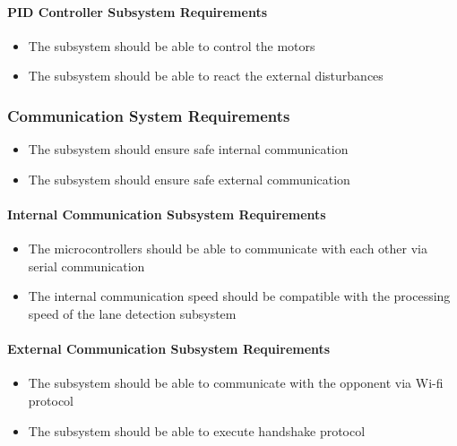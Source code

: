 \documentclass[a4paper,12pt]{article}
\begin{document}
	\paragraph{PID Controller Subsystem Requirements}
	
		\begin{itemize}
			\item The subsystem should be able to control the motors
			\item The subsystem should be able to react the external disturbances
		\end{itemize}
	
	\subsubsection{Communication System Requirements}
		
		\begin{itemize}
			\item The subsystem should ensure safe internal communication
			\item The subsystem should ensure safe external communication
		\end{itemize}
	
	\paragraph{Internal Communication Subsystem Requirements}

		\begin{itemize}
			\item The microcontrollers should be able to communicate with each other via serial communication
			\item The internal communication speed should be compatible with the processing speed of the lane detection subsystem  
		\end{itemize}
	
	\paragraph{External Communication Subsystem Requirements}	
	
		\begin{itemize}
			\item The subsystem should be able to communicate with the opponent via Wi-fi protocol
			\item The subsystem should be able to execute handshake protocol
		\end{itemize}
	
\end{document}
